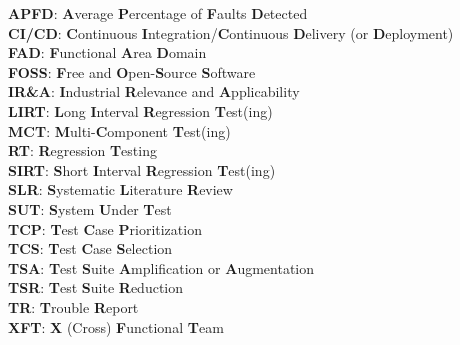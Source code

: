 \documentclass[11pt, a4paper, twoside]{Thesis} %
\begin{document}
\clearpage %
{
\textbf{APFD}: \textbf{A}verage \textbf{P}ercentage of \textbf{F}aults \textbf{D}etected\\
\textbf{CI/CD}: \textbf{C}ontinuous \textbf{I}ntegration/\textbf{C}ontinuous \textbf{D}elivery (or \textbf{D}eployment) \\
\textbf{FAD}: \textbf{F}unctional \textbf{A}rea \textbf{D}omain \\
\textbf{FOSS}: \textbf{F}ree and \textbf{O}pen-\textbf{S}ource \textbf{S}oftware \\
\textbf{IR\&A}: \textbf{I}ndustrial \textbf{R}elevance and \textbf{A}pplicability \\
\textbf{LIRT}: \textbf{L}ong \textbf{I}nterval \textbf{R}egression \textbf{T}est(ing) \\
\textbf{MCT}: \textbf{M}ulti-\textbf{C}omponent \textbf{T}est(ing) \\
\textbf{RT}: \textbf{R}egression \textbf{T}esting \\
\textbf{SIRT}: \textbf{S}hort \textbf{I}nterval \textbf{R}egression \textbf{T}est(ing) \\
\textbf{SLR}: \textbf{S}ystematic \textbf{L}iterature \textbf{R}eview \\
\textbf{SUT}: \textbf{S}ystem \textbf{U}nder \textbf{T}est \\
\textbf{TCP}: \textbf{T}est \textbf{C}ase \textbf{P}rioritization \\
\textbf{TCS}: \textbf{T}est \textbf{C}ase \textbf{S}election \\
\textbf{TSA}: \textbf{T}est \textbf{S}uite \textbf{A}mplification or \textbf{A}ugmentation \\
\textbf{TSR}: \textbf{T}est \textbf{S}uite \textbf{R}eduction \\
\textbf{TR}: \textbf{T}rouble \textbf{R}eport \\
\textbf{XFT}: \textbf{X} (Cross) \textbf{F}unctional \textbf{T}eam \\



}
\end{document}
